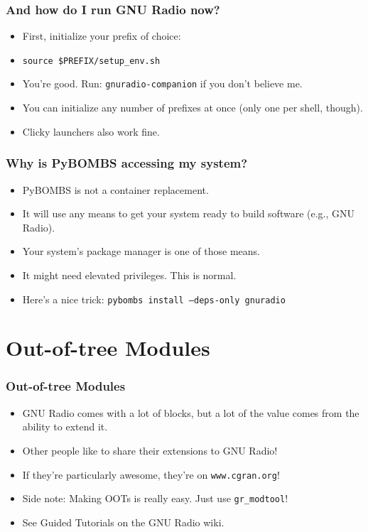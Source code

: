 \documentclass{beamer}
\begin{document}
\begin{frame}
  \frametitle{And how do I run GNU Radio now?}
  \begin{itemize}
    \item First, initialize your prefix of choice:
    \item \texttt{source \$PREFIX/setup\_env.sh}
    \item You're good. Run: \texttt{gnuradio-companion} if you don't believe me.
    \item You can initialize any number of prefixes at once (only one per shell, though).
    \item Clicky launchers also work fine.
  \end{itemize}
\end{frame}

\begin{frame}
  \frametitle{Why is PyBOMBS accessing my system?}
  \begin{itemize}
    \item PyBOMBS is not a container replacement.
    \item It will use any means to get your system ready to build software (e.g., GNU Radio).
    \item Your system's package manager is one of those means.
    \item It might need elevated privileges. This is normal.
    \item Here's a nice trick: \texttt{pybombs install --deps-only gnuradio}
  \end{itemize}
\end{frame}

\section{Out-of-tree Modules}
\begin{frame}
  \frametitle{Out-of-tree Modules}
  \begin{itemize}
    \item GNU Radio comes with a lot of blocks, but a lot of the value comes from the ability to extend it.
    \item Other people like to share their extensions to GNU Radio!
    \item If they're particularly awesome, they're on \texttt{www.cgran.org}!
    \item Side note: Making OOTs is really easy. Just use \texttt{gr\_modtool}!
    \item See Guided Tutorials on the GNU Radio wiki.
  \end{itemize}
\end{frame}
\end{document}
